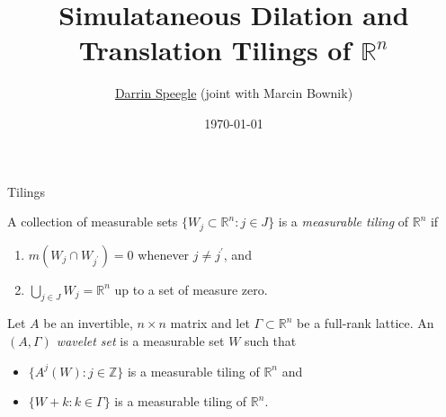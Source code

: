 \documentclass{sintefbeamer}
\title{Simulataneous Dilation and Translation Tilings of ${\mathbb{R}}^n$}
\subtitle{}
\author{\href{mailto:darrin.speegle@slu.edu}{Darrin Speegle} (joint with Marcin Bownik)}
\date{\today}
\newcommand{\Z}{{\mathbb {Z}}}
\newcommand{\R}{{\mathbb {R}}}
\begin{document}
\maketitle

\begin{frame}{Tilings}

\begin{definition}
    A collection of measurable sets $\{W_j\subset \R^n: j\in J\}$ is a {\it {measurable tiling}} of ${\mathbb {R}}^n$ if 
    \begin{enumerate}
        \item $m(W_j \cap W_{{j^\prime}}) = 0$ whenever $j \not= j^\prime$, and
        \item $\bigcup_{j \in J} W_j = {\mathbb {R}}^n$ up to a set of measure zero.
    \end{enumerate}
\end{definition}
    \pause
    \begin{definition}
    Let $A$ be an invertible, $n \times n$ matrix and let $\Gamma\subset \R^n$ be a full-rank lattice.
    An {\it $(A, \Gamma)$ wavelet set} is a measurable set $W$ such that 
    \begin{itemize}
        \item $\{A^j(W): j\in \Z\}$ is a measurable tiling of $\R^n$ and
        \item $\{W + k: k \in \Gamma\}$ is a measurable tiling of $\R^n$. 
    \end{itemize}
    \end{definition}
    
\end{frame}
\end{document}
